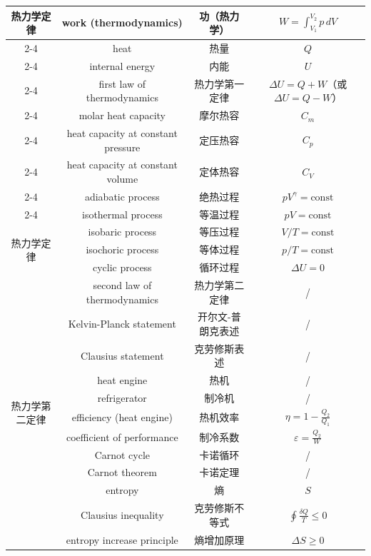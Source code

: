 \documentclass{article}
\begin{document}
\begin{longtable}{|c|c|c|c|}
  \multirow{9}{*}{热力学定律}
  & work (thermodynamics) & 功（热力学） & $W=\int_{V_1}^{V_2}p\,dV$ \\
  \cline{2-4}
  & heat & 热量 & $Q$ \\
  \cline{2-4}
  & internal energy & 内能 & $U$ \\
  \cline{2-4}
  & first law of thermodynamics & 热力学第一定律 & $\Delta U=Q+W$（或 $\Delta U=Q-W$） \\
  \cline{2-4}
  & molar heat capacity & 摩尔热容 & $C_m$ \\
  \cline{2-4}
  & heat capacity at constant pressure & 定压热容 & $C_p$ \\
  \cline{2-4}
  & heat capacity at constant volume & 定体热容 & $C_V$ \\
  \cline{2-4}
  & adiabatic process & 绝热过程 & $pV^\gamma=\text{const}$ \\
  \cline{2-4}
  & isothermal process & 等温过程 & $pV=\text{const}$ \\
  \hline
  \multirow{3}{*}{热力学定律}
  & isobaric process & 等压过程 & $V/T=\text{const}$ \\
  \cline{2-4}
  & isochoric process & 等体过程 & $p/T=\text{const}$ \\
  \cline{2-4}
  & cyclic process & 循环过程 & $\Delta U=0$ \\
  \hline

  \multirow{12}{*}{热力学第二定律}
  & second law of thermodynamics & 热力学第二定律 & / \\
  \cline{2-4}
  & Kelvin-Planck statement & 开尔文-普朗克表述 & / \\
  \cline{2-4}
  & Clausius statement & 克劳修斯表述 & / \\
  \cline{2-4}
  & heat engine & 热机 & / \\
  \cline{2-4}
  & refrigerator & 制冷机 & / \\
  \cline{2-4}
  & efficiency (heat engine) & 热机效率 & $\eta=1-\frac{Q_2}{Q_1}$ \\
  \cline{2-4}
  & coefficient of performance & 制冷系数 & $\varepsilon=\frac{Q_2}{W}$ \\
  \cline{2-4}
  & Carnot cycle & 卡诺循环 & / \\
  \cline{2-4}
  & Carnot theorem & 卡诺定理 & / \\
  \cline{2-4}
  & entropy & 熵 & $S$ \\
  \cline{2-4}
  & Clausius inequality & 克劳修斯不等式 & $\oint\frac{\delta Q}{T}\le 0$ \\
  \cline{2-4}
  & entropy increase principle & 熵增加原理 & $\Delta S\ge 0$ \\
  \hline


\end{longtable}
\end{document}
